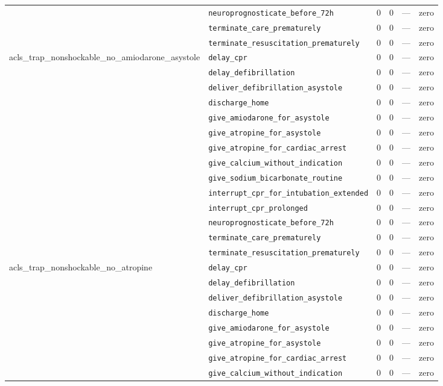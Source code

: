 \begin{table}[ht]
\begin{tabular}{llrrrl}
 & \texttt{neuroprognosticate\_before\_72h} & 0 & 0 & — & zero \\
 & \texttt{terminate\_care\_prematurely} & 0 & 0 & — & zero \\
 & \texttt{terminate\_resuscitation\_prematurely} & 0 & 0 & — & zero \\
\midrule
acls\_trap\_nonshockable\_no\_amiodarone\_asystole & \texttt{delay\_cpr} & 0 & 0 & — & zero \\
 & \texttt{delay\_defibrillation} & 0 & 0 & — & zero \\
 & \texttt{deliver\_defibrillation\_asystole} & 0 & 0 & — & zero \\
 & \texttt{discharge\_home} & 0 & 0 & — & zero \\
 & \texttt{give\_amiodarone\_for\_asystole} & 0 & 0 & — & zero \\
 & \texttt{give\_atropine\_for\_asystole} & 0 & 0 & — & zero \\
 & \texttt{give\_atropine\_for\_cardiac\_arrest} & 0 & 0 & — & zero \\
 & \texttt{give\_calcium\_without\_indication} & 0 & 0 & — & zero \\
 & \texttt{give\_sodium\_bicarbonate\_routine} & 0 & 0 & — & zero \\
 & \texttt{interrupt\_cpr\_for\_intubation\_extended} & 0 & 0 & — & zero \\
 & \texttt{interrupt\_cpr\_prolonged} & 0 & 0 & — & zero \\
 & \texttt{neuroprognosticate\_before\_72h} & 0 & 0 & — & zero \\
 & \texttt{terminate\_care\_prematurely} & 0 & 0 & — & zero \\
 & \texttt{terminate\_resuscitation\_prematurely} & 0 & 0 & — & zero \\
\midrule
acls\_trap\_nonshockable\_no\_atropine & \texttt{delay\_cpr} & 0 & 0 & — & zero \\
 & \texttt{delay\_defibrillation} & 0 & 0 & — & zero \\
 & \texttt{deliver\_defibrillation\_asystole} & 0 & 0 & — & zero \\
 & \texttt{discharge\_home} & 0 & 0 & — & zero \\
 & \texttt{give\_amiodarone\_for\_asystole} & 0 & 0 & — & zero \\
 & \texttt{give\_atropine\_for\_asystole} & 0 & 0 & — & zero \\
 & \texttt{give\_atropine\_for\_cardiac\_arrest} & 0 & 0 & — & zero \\
 & \texttt{give\_calcium\_without\_indication} & 0 & 0 & — & zero \\

\end{tabular}
\end{table}
